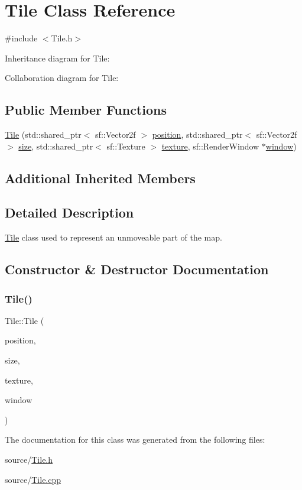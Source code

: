 \hypertarget{classTile}{}\section{Tile Class Reference}
\label{classTile}


{\ttfamily \#include $<$Tile.\+h$>$}



Inheritance diagram for Tile\+:


Collaboration diagram for Tile\+:
\subsection*{Public Member Functions}
\begin{DoxyCompactItemize}
\item 
\hyperlink{classTile_a5707beb25beeb78789f3d98db23cc047}{Tile} (std\+::shared\+\_\+ptr$<$ sf\+::\+Vector2f $>$ \hyperlink{classObject_a8b1724482fb412feb64a638038161b7a}{position}, std\+::shared\+\_\+ptr$<$ sf\+::\+Vector2f $>$ \hyperlink{classObject_ac8bfde5d0428d9c091854fe1a09b7d9f}{size}, std\+::shared\+\_\+ptr$<$ sf\+::\+Texture $>$ \hyperlink{classObject_a8ff6491b841d0f48da3d98041fbca934}{texture}, sf\+::\+Render\+Window $\ast$\hyperlink{classObject_a5c6cfc086ea1e39e0b3cf8633a763bf8}{window})
\end{DoxyCompactItemize}
\subsection*{Additional Inherited Members}


\subsection{Detailed Description}
\hyperlink{classTile}{Tile} class used to represent an unmoveable part of the map. 

\subsection{Constructor \& Destructor Documentation}
\mbox{\label{classTile_a5707beb25beeb78789f3d98db23cc047}} 
\subsubsection{\texorpdfstring{Tile()}{Tile()}}
{\footnotesize\ttfamily Tile\+::\+Tile (\begin{DoxyParamCaption}\item[{std\+::shared\+\_\+ptr$<$ sf\+::\+Vector2f $>$}]{position,  }\item[{std\+::shared\+\_\+ptr$<$ sf\+::\+Vector2f $>$}]{size,  }\item[{std\+::shared\+\_\+ptr$<$ sf\+::\+Texture $>$}]{texture,  }\item[{sf\+::\+Render\+Window $\ast$}]{window }\end{DoxyParamCaption})}



The documentation for this class was generated from the following files\+:\begin{DoxyCompactItemize}
\item 
source/\hyperlink{Tile_8h}{Tile.\+h}\item 
source/\hyperlink{Tile_8cpp}{Tile.\+cpp}\end{DoxyCompactItemize}
